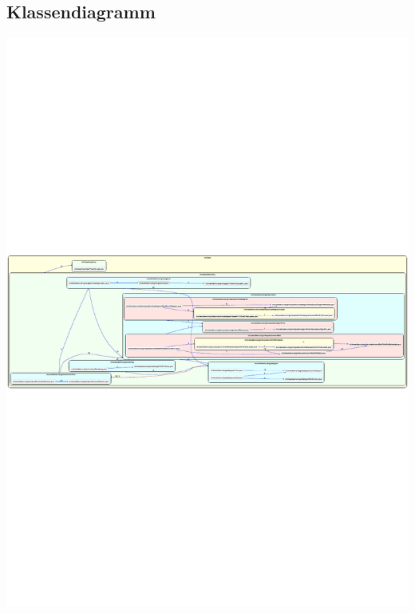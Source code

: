 \documentclass[a4paper,10pt]{article}
\begin{document}
\subsection{Klassendiagramm}
\begin{minipage}[b]{0.5\linewidth}
\centering
\includegraphics[width=\textheight, angle=90]{img/ArchInternalDependencies-ch}
\end{minipage}
\hspace{0.5cm}
\end{document}
